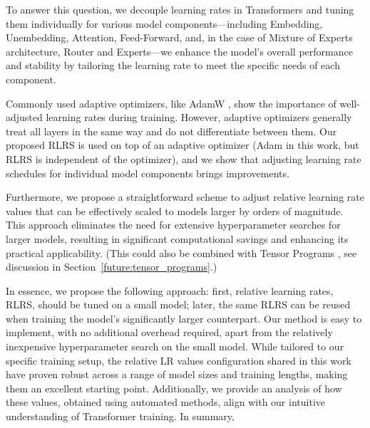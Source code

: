 \documentclass{article}
\theoremstyle{plain}
\theoremstyle{definition}
\theoremstyle{remark}
\begin{document}
    To answer this question, we decouple learning rates in Transformers and tuning them individually for various model components—including Embedding, Unembedding, Attention, Feed-Forward, and, in the case of Mixture of Experts architecture, Router and Experts—we enhance the model's overall performance and stability by tailoring the learning rate to meet the specific needs of each component. 
    
    Commonly used adaptive optimizers, like AdamW \citep{loshchilov2019decoupled}, show the importance of well-adjusted learning rates during training. However, adaptive optimizers generally treat all layers in the same way and do not differentiate between them. Our proposed RLRS is used on top of an adaptive optimizer (Adam in this work, but RLRS is independent of the optimizer), and we show that adjusting learning rate schedules for individual model components brings improvements.
    
    
    
    Furthermore, we propose a straightforward scheme to adjust relative learning rate values that can be effectively scaled to models larger by orders of magnitude. This approach eliminates the need for extensive hyperparameter searches for larger models, resulting in significant computational savings and enhancing its practical applicability. (This could also be combined with Tensor Programs \citep{yang2022tensor}, see discussion in Section~\ref{future:tensor_programs}.)%
    
    In essence, we propose the following approach: first, relative learning rates, RLRS, should be tuned on a small model; later, the same RLRS can be reused when training the model's significantly larger counterpart.
    Our method is easy to implement, with no additional overhead required, apart from the relatively inexpensive hyperparameter search on the small model. While tailored to our specific training setup, the relative LR values configuration shared in this work have proven robust across a range of model sizes and training lengths, making them an excellent starting point. 
    Additionally, we provide an analysis of how these values, obtained using automated methods, align with our intuitive understanding of Transformer training. In summary,
    
\end{document}
